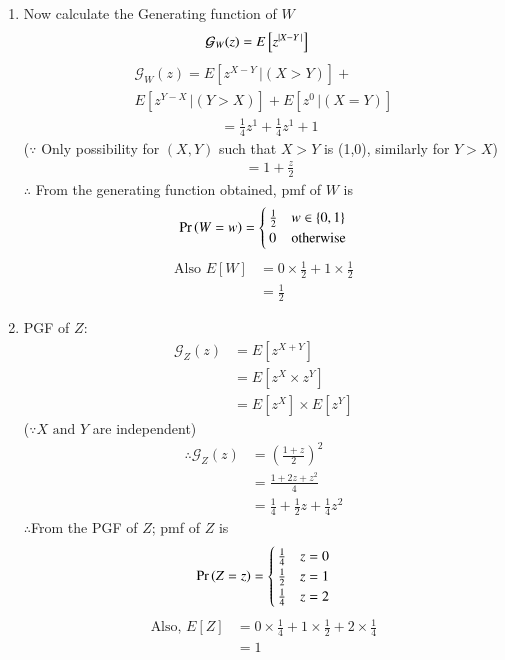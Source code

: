 \documentclass[journal,12pt,twocolumn]{IEEEtran}
\begin{document}
 \begin{enumerate}[label=\alph*)]
\item Now calculate the Generating function of $W$
\begin{align}
    \mathcal{G}_W(z) &= E\left[z^{\vert X-Y\,\vert}\right]
\end{align}
\begin{multline}
  \mathcal{G}_W(z) = E\left[z^{X-Y}\,|(X>Y)\right] +\\ E\left[z^{Y-X}\,|(Y>X)\right] + E\left[z^0\,|(X=Y)\right]
\end{multline}
\begin{align}
    &= \frac{1}{4}z^1 + \frac{1}{4}z^1+1
\end{align}
($\because$ Only possibility for $(X,Y)$ such that $X>Y$ is (1,0), similarly for $Y>X$)
\begin{align}
  &= 1+\frac{z}{2}
\end{align}
$\therefore$ From the generating function obtained, pmf of $W$ is
\begin{equation}
   \Pr\left(W=w\right) =
    \begin{cases}
      \frac{1}{2} & w \in \left\{0,1\right\}\\
      0 & \text{otherwise}
    \end{cases}       
\end{equation}
\begin{align}
   \text{Also }E[W] &= 0\times\frac{1}{2} + 1\times\frac{1}{2}\\
                    &= \frac{1}{2} 
\end{align}
\item PGF of $Z$:
\begin{align}
  \mathcal{G}_Z(z) &= E[z^{X+Y}]\\
                   &= E[z^X \times z^Y]\\
                   &= E[z^X]\times E[z^Y] 
\end{align}
($\because X \text{ and } Y$ are independent)
\begin{align}
 \therefore \mathcal{G}_Z(z) &=\left(\frac{1 + z}{2}\right)^2\\
                   &= \frac{1+2z+z^2}{4}\\
                   &= \frac{1}{4} + \frac{1}{2}z + \frac{1}{4}z^2
\end{align}
$\therefore$From the PGF of $Z$; \;pmf of $Z$ is
\begin{align}
    \Pr\left(Z = z\right) = 
\begin{cases}
\frac{1}{4} & z=0
\\
\frac{1}{2} & z=1\\
\frac{1}{4} & z=2
\end{cases}\label{2}
\end{align}
\begin{align}
    \text{Also, } E[Z] &= 0\times\frac{1}{4} + 1\times\frac{1}{2} + 2\times\frac{1}{4}\\
                     &= 1
\end{align}
\end{enumerate}
\end{document}
